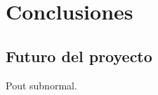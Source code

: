 \chapter {Conclusiones}

\section{Futuro del proyecto}
\begin{paragraph}
	Pout subnormal.
\end{paragraph}